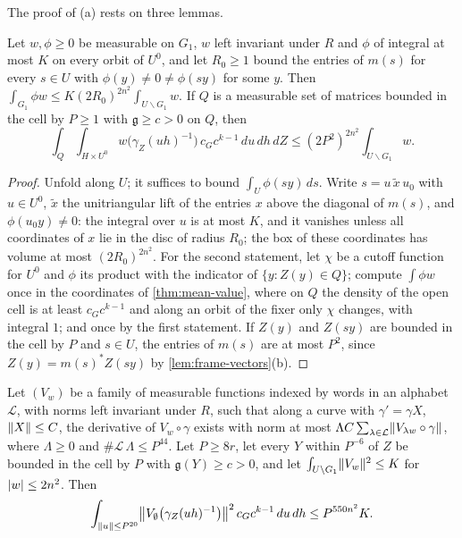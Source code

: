 The proof of (a) rests on three lemmas.

\begin{lemma}\label{lem:unfold-frame}
Let $w,\phi\ge0$ be measurable on $G_1$, $w$ left invariant under $R$ and $\phi$ of integral at most $K$ on every orbit of $U^0$, and let $R_0\ge1$ bound the entries of $m(s)$ for every $s\in U$ with $\phi(y)\ne0\ne\phi(sy)$ for some $y$. Then
$\int_{G_1}\phi w\le K(2R_0)^{2n^2}\int_{U\backslash G_1}w$. If $Q$ is a measurable set of matrices bounded in the cell by $P\ge1$ with $\mathfrak g\ge c>0$ on $Q$, then
\[
  \int_Q\int_{H\times U^0}w\bigl(\gamma_Z(uh)^{-1}\bigr)\,c_Gc^{k-1}\,du\,dh\,dZ\le(2P^2)^{2n^2}\int_{U\backslash G_1}w .
\]
\end{lemma}

\begin{proof}
Unfold along $U$; it suffices to bound $\int_U\phi(sy)\,ds$. Write $s=u\,\tilde x\,u_0$ with $u\in U^0$, $\tilde x$ the unitriangular lift of the entries $x$ above the diagonal of $m(s)$, and $\phi(u_0y)\ne0$: the integral over $u$ is at most $K$, and it
vanishes unless all coordinates of $x$ lie in the disc of radius $R_0$; the box of these coordinates has volume at most $(2R_0)^{2n^2}$. For the second statement, let $\chi$ be a cutoff function for $U^0$ and $\phi$ its product with the
indicator of $\{y:Z(y)\in Q\}$; compute $\int\phi w$ once in the coordinates of \cref{thm:mean-value}, where on $Q$ the density of the open cell is at least $c_Gc^{k-1}$ and along an orbit of the fixer only $\chi$ changes, with integral $1$; and once by
the first statement. If $Z(y)$ and $Z(sy)$ are bounded in the cell by $P$ and $s\in U$, the entries of $m(s)$ are at most $P^2$, since $Z(y)=m(s)^*Z(sy)$ by \cref{lem:frame-vectors}(b).
\end{proof}

\begin{lemma}\label{lem:sobolev-section}
Let $(V_w)$ be a family of measurable functions indexed by words in an alphabet $\mathcal L$, with norms left invariant under $R$, such that along a curve with $\gamma'=\gamma X$, $\lVert X\rVert\le C$, the derivative of
$V_w\circ\gamma$ exists with norm at most $\Lambda C\sum_{\lambda\in\mathcal L}\lVert V_{\lambda w}\circ\gamma\rVert$, where $\Lambda\ge0$ and $\#\mathcal L\,\Lambda\le P^{44}$. Let $P\ge8r$, let every $Y$ within $P^{-6}$ of $Z$ be bounded in the cell by $P$ with $\mathfrak g(Y)\ge c>0$, and
let $\int_{U\backslash G_1}\lVert V_w\rVert^2\le K$ for $\lvert w\rvert\le2n^2$. Then
\[
  \int_{\lVert u\rVert\le P^{20}}\bigl\|V_\emptyset\bigl(\gamma_Z(uh)^{-1}\bigr)\bigr\|^2\,c_Gc^{k-1}\,du\,dh\le P^{550n^2}K.
\]
\end{lemma}

